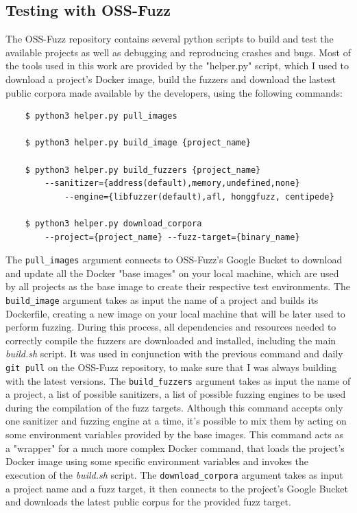 \subsection{Testing with OSS-Fuzz}
The OSS-Fuzz repository contains several python scripts to build and test the available projects as well as debugging and reproducing crashes and bugs. Most of the tools used in this work are provided by the "helper.py" script, which I used to download a project's Docker image, build the fuzzers and download the lastest public corpora made available by the developers, using the following commands:
\begin{verbatim}
    $ python3 helper.py pull_images 

    $ python3 helper.py build_image {project_name}

    $ python3 helper.py build_fuzzers {project_name}
        --sanitizer={address(default),memory,undefined,none} 
            --engine={libfuzzer(default),afl, honggfuzz, centipede}
        
    $ python3 helper.py download_corpora 
        --project={project_name} --fuzz-target={binary_name}
\end{verbatim}

The \verb|pull_images| argument connects to OSS-Fuzz's Google Bucket to download and update all the Docker "base images" on your local machine, which are used by all projects as the base image to create their respective test environments.
The \verb|build_image| argument takes as input the name of a project and builds its Dockerfile, creating a new image on your local machine that will be later used to perform fuzzing. During this process, all dependencies and resources needed to correctly compile the fuzzers are downloaded and installed, including the main \textit{build.sh} script. It was used in conjunction with the previous command and daily \verb|git pull| on the OSS-Fuzz repository, to make sure that I was always building with the latest versions. 
The \verb|build_fuzzers| argument takes as input the name of a project, a list of possible sanitizers, a list of possible fuzzing engines to be used during the compilation of the fuzz targets. Although this command accepts only one sanitizer and fuzzing engine at a time, it's possible to mix them by acting on some environment variables provided by the base images. This command acts as a "wrapper" for a much more complex Docker command, that loads the project's Docker image using some specific environment variables and invokes the execution of the \textit{build.sh} script.
The \verb|download_corpora| argument takes as input a project name and a fuzz target, it then connects to the project's Google Bucket and downloads the latest public corpus for the provided fuzz target.

